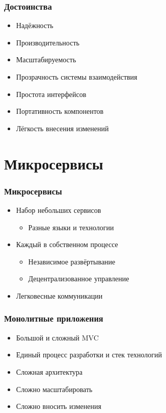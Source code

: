 \documentclass[xetex,mathserif,serif]{beamer}
\begin{document}
    \begin{frame}
        \frametitle{Достоинства}
        \begin{itemize}
            \item Надёжность
            \item Производительность
            \item Масштабируемость
            \item Прозрачность системы взаимодействия
            \item Простота интерфейсов
            \item Портативность компонентов
            \item Лёгкость внесения изменений
        \end{itemize}
    \end{frame}

    \section{Микросервисы}

    \begin{frame}
        \frametitle{Микросервисы}
        \begin{itemize}
            \item Набор небольших сервисов
            \begin{itemize}
                \item Разные языки и технологии
            \end{itemize}
            \item Каждый в собственном процессе
            \begin{itemize}
                \item Независимое развёртывание
                \item Децентрализованное управление
            \end{itemize}
            \item Легковесные коммуникации
        \end{itemize}
    \end{frame}

    \begin{frame}
        \frametitle{Монолитные приложения}
        \begin{itemize}
            \item Большой и сложный MVC
            \item Единый процесс разработки и стек технологий
            \item Сложная архитектура
            \item Сложно масштабировать
            \item Сложно вносить изменения
        \end{itemize}
    \end{frame}
\end{document}
